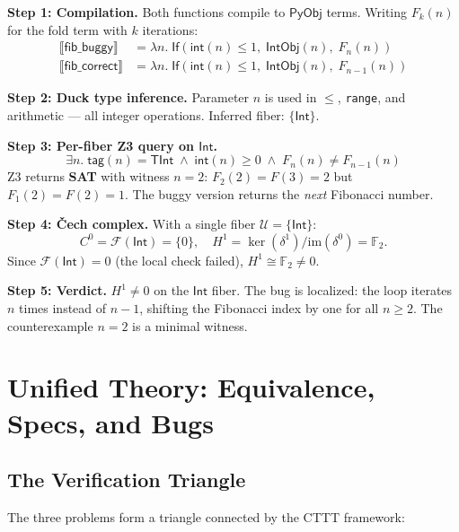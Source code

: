 \documentclass[11pt,a4paper]{report}
\theoremstyle{definition}
\theoremstyle{plain}
\newcommand{\den}[1]{\llbracket #1 \rrbracket}
\newcommand{\PyObj}{\mathsf{PyObj}}
\newcommand{\covers}{\mathcal{U}}
\newcommand{\Hone}{H^1}
\newcommand{\presheaf}{\mathcal{F}}
\begin{document}
\textbf{Step 1: Compilation.}  Both functions compile to $\PyObj$
terms.  Writing $F_k(n)$ for the fold term with $k$ iterations:
\begin{align}
  \den{\mathsf{fib\_buggy}} &= \lambda n.\;
    \mathsf{If}(\mathsf{int}(n) \leq 1,\; \mathsf{IntObj}(n),\;
    F_n(n)) \\
  \den{\mathsf{fib\_correct}} &= \lambda n.\;
    \mathsf{If}(\mathsf{int}(n) \leq 1,\; \mathsf{IntObj}(n),\;
    F_{n-1}(n))
\end{align}

\textbf{Step 2: Duck type inference.}  Parameter $n$ is used in
$\leq$, \texttt{range}, and arithmetic --- all integer operations.
Inferred fiber: $\{\mathsf{Int}\}$.

\textbf{Step 3: Per-fiber Z3 query on $\mathsf{Int}$.}
\[
  \exists n.\; \mathsf{tag}(n) = \mathsf{TInt} \;\land\;
  \mathsf{int}(n) \geq 0 \;\land\;
  F_n(n) \neq F_{n-1}(n)
\]
Z3 returns \textbf{SAT} with witness $n = 2$: $F_2(2) = F(3) = 2$
but $F_1(2) = F(2) = 1$.  The buggy version returns the \emph{next}
Fibonacci number.

\textbf{Step 4: \v{C}ech complex.}  With a single fiber
$\covers = \{\mathsf{Int}\}$:
\[
  C^0 = \presheaf(\mathsf{Int}) = \{0\}, \quad
  \Hone = \ker(\delta^1) / \mathrm{im}(\delta^0) = \mathbb{F}_2.
\]
Since $\presheaf(\mathsf{Int}) = 0$ (the local check failed),
$\Hone \cong \mathbb{F}_2 \neq 0$.

\textbf{Step 5: Verdict.}  $\Hone \neq 0$ on the $\mathsf{Int}$
fiber.  The bug is localized: the loop iterates $n$ times instead
of $n - 1$, shifting the Fibonacci index by one for all $n \geq 2$.
The counterexample $n = 2$ is a minimal witness.


\chapter{Unified Theory: Equivalence, Specs, and Bugs}
\label{ch:unified}

\section{The Verification Triangle}

The three problems form a triangle connected by the CTTT framework:

\begin{center}
\end{center}
\end{document}
